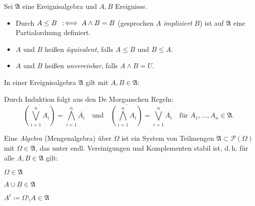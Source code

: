 \documentclass{cheat-sheet}
\newcommand{\Alg}{\mathfrak{A}} %
\let\myBigvee\bigvee
\DeclareMathOperator*{\textbigvee}{{\textstyle \myBigvee}}
\renewcommand{\bigvee}{\textbigvee\limits}
\let\myBigwedge\bigwedge
\DeclareMathOperator*{\textbigwedge}{{\textstyle \myBigwedge}}
\renewcommand{\bigwedge}{\textbigwedge\limits}
\begin{document}
\begin{defn}
  Sei $\Alg$ eine Ereignisalgebra und $A, B$ Ereignisse.
  \begin{itemize}
    \item Durch $A \leq B \enspace:\!\iff A \wedge B = B$ (gesprochen $A$ \emph{impliziert} $B$) ist auf $\Alg$ eine Partialordnung definiert.
    \item $A$ und $B$ heißen \emph{äquivalent}, falls $A \leq B$ und $B \leq A$.
    \item $A$ und $B$ heißen \emph{unvereinbar}, falls $A \wedge B = U$.
  \end{itemize}
\end{defn}

\begin{kor}
  In einer Ereignisalgebra $\Alg$ gilt mit $A, B \in \Alg$:
  \begin{itemize}
  \end{itemize}
  \vspace{-2pt} %
  \begin{itemize}
  \end{itemize}
\end{kor}

\begin{kor}
  Durch Induktion folgt aus den De Morganschen Regeln:
  \[
    \overline{\left( \bigvee_{i=1}^n A_i \right)} = \bigwedge_{i=1}^n \overline{A_i}
    \quad \text{und} \quad
    \overline{\left( \bigwedge_{i=1}^n A_i \right)} = \bigvee_{i=1}^n \overline{A_i}
    \quad \text{für } A_1, ..., A_n \in \Alg.
  \]
\end{kor}


\begin{defn}
  Eine \emph{Algebra} (Mengenalgebra) über $\Omega$ ist ein System von Teilmengen $\Alg \subset \mathcal{P}(\Omega)$ mit $\Omega \in \Alg$, das unter endl. Vereinigungen und Komplementen stabil ist, d.\,h. für alle $A, B \in \Alg$ gilt:
  \begin{itemize}
    \begin{multicols}{3}
      \item $\Omega \in \Alg$
      \item $A \cup B \in \Alg$
      \item $A^c \coloneqq \Omega \setminus A \in \Alg$
    \end{multicols}
  \end{itemize}
\end{defn}
\end{document}
